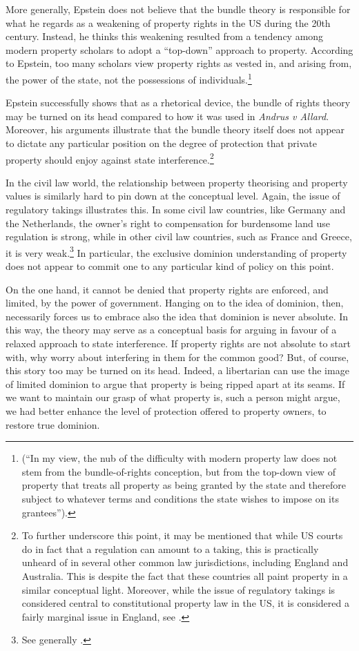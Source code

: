 More generally, Epstein does not believe that the bundle theory is responsible for what he regards as a weakening of property rights in the US during the 20th century. Instead, he thinks this weakening resulted from a tendency among modern property scholars to adopt a ``top-down'' approach to property. According to Epstein, too many scholars view property rights as vested in, and arising from, the power of the state, not the possessions of individuals.\footnote{\cite[227-228]{epstein11} (``In my view, the nub of the difficulty with modern property law does not stem from the bundle-of-rights conception, but from the top-down view of property that treats all property as being granted by the state and therefore subject to whatever terms and conditions the state wishes to impose on its grantees'').} 

Epstein successfully shows that as a rhetorical device, the bundle of rights theory may be turned on its head compared to how it was used in {\it Andrus v Allard}. Moreover, his arguments illustrate that the bundle theory itself does not appear to dictate any particular position on the degree of protection that private property should enjoy against state interference.\footnote{To further underscore this point, it may be mentioned that while US courts do in fact  that a regulation can amount to a taking, this is practically unheard of in several other common law jurisdictions, including England and Australia. This is despite the fact that these countries all paint property in a similar conceptual light. Moreover, while the issue of regulatory takings is considered central to constitutional property law in the US, it is considered a fairly marginal issue in England, see \cite{purdue10}.}

In the civil law world, the relationship between property theorising and property values is similarly hard to pin down at the conceptual level. Again, the issue of regulatory takings illustrates this. In some civil law countries, like Germany and the Netherlands, the owner's right to compensation for burdensome land use regulation is strong, while in other civil law countries, such as France and Greece, it is very weak.\footnote{See generally \cite{alterman10}.} In particular, the exclusive dominion understanding of property does not appear to commit one to any particular kind of policy on this point. 

On the one hand, it cannot be denied that property rights are enforced, and limited, by the power of government. Hanging on to the idea of dominion, then, necessarily forces us to embrace also the idea that dominion is never absolute. In this way, the theory may serve as a conceptual basis for arguing in favour of a relaxed approach to state interference. If property rights are not absolute to start with, why worry about interfering in them for the common good? But, of course, this story too may be turned on its head. Indeed, a libertarian can use the image of limited dominion to argue that property is being ripped apart at its seams. If we want to maintain our grasp of what property is, such a person might argue, we had better enhance the level of protection offered to property owners, to restore true dominion.

